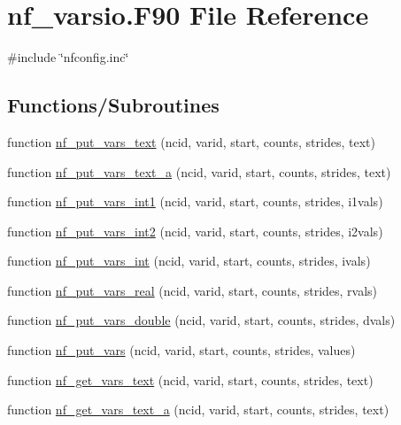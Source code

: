 \hypertarget{nf__varsio_8F90}{}\section{nf\+\_\+varsio.\+F90 File Reference}
\label{nf__varsio_8F90}
{\ttfamily \#include \char`\"{}nfconfig.\+inc\char`\"{}}\newline
\subsection*{Functions/\+Subroutines}
\begin{DoxyCompactItemize}
\item 
function \hyperlink{nf__varsio_8F90_af36c37544feece9fa30e57ac27de71b0}{nf\+\_\+put\+\_\+vars\+\_\+text} (ncid, varid, start, counts, strides, text)
\item 
function \hyperlink{nf__varsio_8F90_aad23992faf28c3dcc859498ea186594c}{nf\+\_\+put\+\_\+vars\+\_\+text\+\_\+a} (ncid, varid, start, counts, strides, text)
\item 
function \hyperlink{nf__varsio_8F90_aeed2a4291a6875e72f437d266f2bbc90}{nf\+\_\+put\+\_\+vars\+\_\+int1} (ncid, varid, start, counts, strides, i1vals)
\item 
function \hyperlink{nf__varsio_8F90_a8bdeab8e74d82a72189d13dd200a72a0}{nf\+\_\+put\+\_\+vars\+\_\+int2} (ncid, varid, start, counts, strides, i2vals)
\item 
function \hyperlink{nf__varsio_8F90_a6224b779eed20d70314cf48c39b9ae70}{nf\+\_\+put\+\_\+vars\+\_\+int} (ncid, varid, start, counts, strides, ivals)
\item 
function \hyperlink{nf__varsio_8F90_ada8628e3ad21d9652e908ccd541ac0d0}{nf\+\_\+put\+\_\+vars\+\_\+real} (ncid, varid, start, counts, strides, rvals)
\item 
function \hyperlink{nf__varsio_8F90_a640788dd416a5c7ba6d3da2301a96691}{nf\+\_\+put\+\_\+vars\+\_\+double} (ncid, varid, start, counts, strides, dvals)
\item 
function \hyperlink{nf__varsio_8F90_a1c00336b474470cac7f8f18ee7ac1a58}{nf\+\_\+put\+\_\+vars} (ncid, varid, start, counts, strides, values)
\item 
function \hyperlink{nf__varsio_8F90_a9a8e9e291559bb6aa380d5f01f74075f}{nf\+\_\+get\+\_\+vars\+\_\+text} (ncid, varid, start, counts, strides, text)
\item 
function \hyperlink{nf__varsio_8F90_ae3f2667a79da79ab4d85c1d07addbab3}{nf\+\_\+get\+\_\+vars\+\_\+text\+\_\+a} (ncid, varid, start, counts, strides, text)

\end{DoxyCompactItemize}
